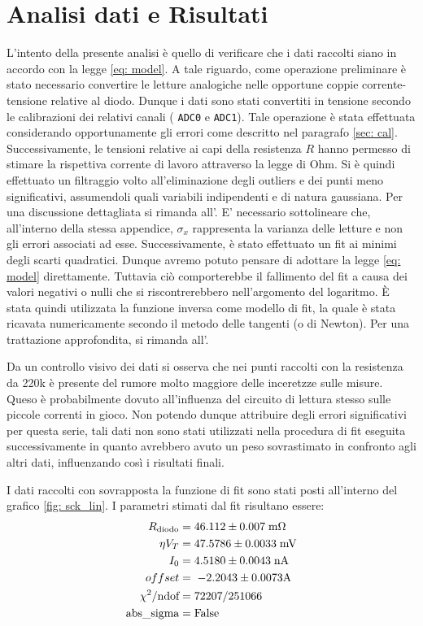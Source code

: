 \documentclass{article}[a4paper, oneside, 11pt]
\begin{document}
\section{Analisi dati e Risultati}
L’intento della presente analisi è quello di verificare che i dati raccolti 
siano in accordo con la legge \eqref{eq: model}. A tale riguardo, come 
operazione preliminare è stato necessario convertire le letture analogiche 
nelle opportune coppie corrente-tensione relative al diodo. Dunque i dati sono 
stati convertiti in tensione secondo le calibrazioni dei relativi canali (
\verb+ADC0+ e \verb+ADC1+). Tale operazione è stata effettuata considerando
opportunamente gli errori come descritto nel paragrafo \ref{sec: cal}.
Successivamente, le tensioni relative ai capi della resistenza $R$ hanno
permesso di stimare la rispettiva corrente di lavoro attraverso la legge di Ohm. 
Si è quindi effettuato un filtraggio volto all'eliminazione degli outliers e 
dei punti meno significativi, assumendoli quali variabili indipendenti e di 
natura gaussiana. Per una discussione dettagliata si rimanda all'. E’ necessario sottolineare che, all’interno della stessa appendice, 
$\sigma_x$ rappresenta la varianza delle letture e non gli errori associati ad 
esse.
Successivamente, è stato effettuato un fit ai minimi degli scarti quadratici. 
Dunque avremo potuto pensare di adottare la legge \eqref{eq: model} 
direttamente. Tuttavia ciò comporterebbe il fallimento del fit a causa dei 
valori negativi o nulli che si riscontrerebbero nell’argomento del logaritmo. 
\`E stata quindi utilizzata la funzione inversa come modello di fit, la quale 
è stata ricavata numericamente secondo il metodo delle tangenti (o di Newton). 
Per una trattazione approfondita, si rimanda all'.

Da un controllo visivo dei dati si osserva che nei punti raccolti con la resistenza da 220k è presente del rumore molto maggiore delle inceretzze sulle misure. Queso è probabilmente dovuto all'influenza del circuito di lettura stesso sulle piccole correnti in gioco. Non potendo dunque attribuire degli errori significativi per questa serie, tali dati non sono stati utilizzati nella procedura di fit eseguita successivamente in quanto avrebbero avuto un peso sovrastimato in confronto agli altri dati, influenzando così i risultati finali.

I dati raccolti con sovrapposta la funzione di fit sono stati posti all'interno 
del grafico \ref{fig: sck_lin}.
I parametri stimati dal fit risultano essere:
\begin{align*}
	R_{\text{diodo}} &= 46.112 \pm 0.007 \; \rm m\Omega \\
	\eta V_T &= 47.5786 \pm 0.0033 \; \rm mV \\
	I_0 &= 4.5180 \pm 0.0043 \; \rm nA \\
	offset &=\; - 2.2043\pm 0.0073\rm A\\
	\chi^2/\text{ndof} &= 72207/251066 \\
	\text{abs\_sigma} &= \rm False
\end{align*}
\end{document}
